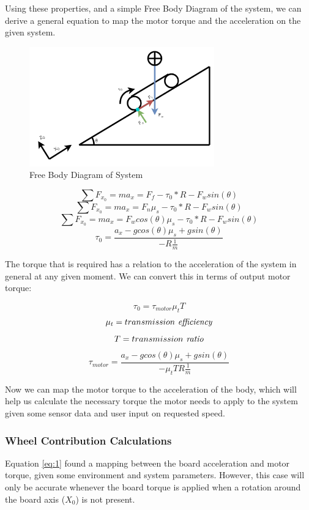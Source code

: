 \documentclass[titlepage, letterpaper,12pt]{article}
\begin{document}
Using these properties, and a simple Free Body Diagram of the system, we can derive a general equation to map the motor torque and the acceleration on the given system.

\begin{figure}[h]
\caption{Free Body Diagram of System}
\includegraphics[width=8cm]{figs/FBD_MESB.png}
\centering
\end{figure}

\[\sum F _{x _{0}} = ma _x = F _f - \tau _{0} * R - F _wsin(\theta )\]
\[\sum F _{x _{0}} = ma _x = F _n \mu _s - \tau _{0} * R - F _wsin(\theta )\]
\[\sum F _{x _{0}} = ma _x = F _wcos(\theta) \mu _s - \tau _{0} * R - F _wsin(\theta )\]
\[\tau _{0} = \frac{a _x - gcos(\theta)\mu _s + gsin(\theta)}{-R \frac{1}{m}}\]

The torque that is required has a relation to the acceleration of the system in general at any given moment. We can convert this in terms of output motor torque:

\[\tau _0 = \tau _{motor}\mu_tT\]
\[\mu_t = transmission  \emph{ efficiency}\]
\[T = transmission \emph{ ratio}\]
\begin{equation} \label{eq:1}
    \tau _{motor} = \frac{a _x - gcos(\theta)\mu _s + gsin(\theta)}{-\mu_t T R \frac{1}{m}}
\end{equation}

Now we can map the motor torque to the acceleration of the body, which will help us calculate the necessary torque the motor needs to apply to the system given some sensor data and user input on requested speed.

\subsubsection{Wheel Contribution Calculations}
Equation \ref{eq:1} found a mapping between the board acceleration and motor torque, given some environment and system parameters. However, this case will only be accurate whenever the board torque is applied when a rotation around the board axis ($X _{0}$) is not present.
\end{document}
